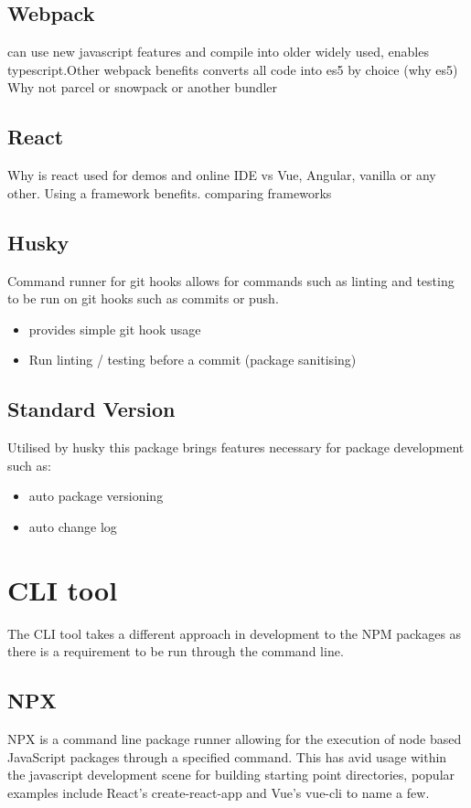 \documentclass{l4proj}
\begin{document}
\subsection{Webpack}
\text can use new javascript features and compile into older widely used, enables typescript.Other webpack benefits converts all code into es5 by choice (why es5)
Why not parcel or snowpack or another bundler

\subsection{React }
\text Why is react used for demos and online IDE vs Vue, Angular, vanilla or any other. Using a framework benefits.
comparing frameworks

\subsection{Husky }
Command runner for git hooks allows for commands such as linting and testing to be run on git hooks such as commits or push.
\begin{itemize}
    \item provides simple git hook usage
    \item Run linting / testing before a commit (package sanitising)
\end{itemize}
\subsection{Standard Version}
Utilised by husky this package brings features necessary for package development such as:
\begin{itemize}
    \item auto package versioning
    \item auto change log
\end{itemize}

\section{CLI tool }

The CLI tool takes a different approach in development to the NPM packages as there is a requirement to be run through the command line.

\subsection{NPX }
\text NPX is a command line package runner allowing for the execution of node based JavaScript packages through a specified command. This has avid usage within the javascript development scene for building starting point directories, popular examples include React's create-react-app and Vue's vue-cli to name a few.
\end{document}
